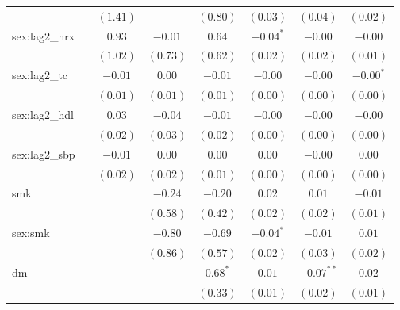 \begin{tabular}{l c c c c c c c}
                     &               & $(1.41)$      &             & $(0.80)$      & $(0.03)$      & $(0.04)$      & $(0.02)$      \\
sex:lag2\_hrx        &               & $0.93$        & $-0.01$     & $0.64$        & $-0.04^{*}$   & $-0.00$       & $-0.00$       \\
                     &               & $(1.02)$      & $(0.73)$    & $(0.62)$      & $(0.02)$      & $(0.02)$      & $(0.01)$      \\
sex:lag2\_tc         &               & $-0.01$       & $0.00$      & $-0.01$       & $-0.00$       & $-0.00$       & $-0.00^{*}$   \\
                     &               & $(0.01)$      & $(0.01)$    & $(0.01)$      & $(0.00)$      & $(0.00)$      & $(0.00)$      \\
sex:lag2\_hdl        &               & $0.03$        & $-0.04$     & $-0.01$       & $-0.00$       & $-0.00$       & $-0.00$       \\
                     &               & $(0.02)$      & $(0.03)$    & $(0.02)$      & $(0.00)$      & $(0.00)$      & $(0.00)$      \\
sex:lag2\_sbp        &               & $-0.01$       & $0.00$      & $0.00$        & $0.00$        & $-0.00$       & $0.00$        \\
                     &               & $(0.02)$      & $(0.02)$    & $(0.01)$      & $(0.00)$      & $(0.00)$      & $(0.00)$      \\
smk                  &               &               & $-0.24$     & $-0.20$       & $0.02$        & $0.01$        & $-0.01$       \\
                     &               &               & $(0.58)$    & $(0.42)$      & $(0.02)$      & $(0.02)$      & $(0.01)$      \\
sex:smk              &               &               & $-0.80$     & $-0.69$       & $-0.04^{*}$   & $-0.01$       & $0.01$        \\
                     &               &               & $(0.86)$    & $(0.57)$      & $(0.02)$      & $(0.03)$      & $(0.02)$      \\
dm                   &               &               &             & $0.68^{*}$    & $0.01$        & $-0.07^{**}$  & $0.02$        \\
                     &               &               &             & $(0.33)$      & $(0.01)$      & $(0.02)$      & $(0.01)$      \\

\end{tabular}
